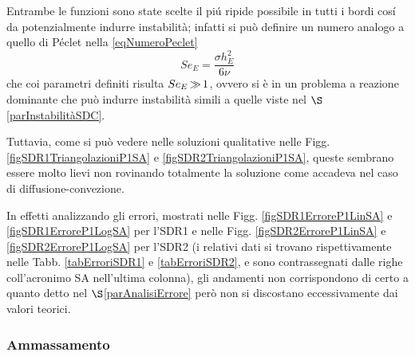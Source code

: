 \documentclass{article}
\newcommand{\SpaziaturaMate}[3]{
    \setlength{\thinmuskip}{#1mu}
    \setlength{\medmuskip}{#2mu}
    \setlength{\thickmuskip}{#3mu}
}
\begin{document}
                Entrambe le funzioni sono state scelte il piú ripide possibile in tutti i bordi cosí da potenzialmente indurre instabilità; infatti si può definire un numero analogo a quello di Péclet nella \eqref{eqNumeroPeclet}
                \begin{equation*}
                    Se_E=\frac{\sigma h_E^2}{6\nu}
                \end{equation*}
                che coi parametri definiti risulta {$\SpaziaturaMate{1}{2}{3}Se_E\gg1$}, ovvero si è in un problema a reazione dominante che può indurre instabilità simili a quelle viste nel $\S$\ref{parInstabilitàSDC}.

                Tuttavia, come si può vedere nelle soluzioni qualitative nelle Figg. \ref{figSDR1TriangolazioniP1SA} e \ref{figSDR2TriangolazioniP1SA}, queste sembrano essere molto lievi non rovinando totalmente la soluzione come accadeva nel caso di diffusione-convezione.

                In effetti analizzando gli errori, mostrati nelle Figg. \ref{figSDR1ErroreP1LinSA} e \ref{figSDR1ErroreP1LogSA} per l'SDR1 e nelle Figg. \ref{figSDR2ErroreP1LinSA} e \ref{figSDR2ErroreP1LogSA} per l'SDR2 (i relativi dati si trovano rispettivamente nelle Tabb. \ref{tabErroriSDR1} e \ref{tabErroriSDR2}, e sono contrassegnati dalle righe coll'acronimo SA nell'ultima colonna), gli andamenti non corrispondono di certo a quanto detto nel $\S$\ref{parAnalisiErrore} però non si discostano eccessivamente dai valori teorici.
                
                
            \subsubsection{Ammassamento}
\end{document}
